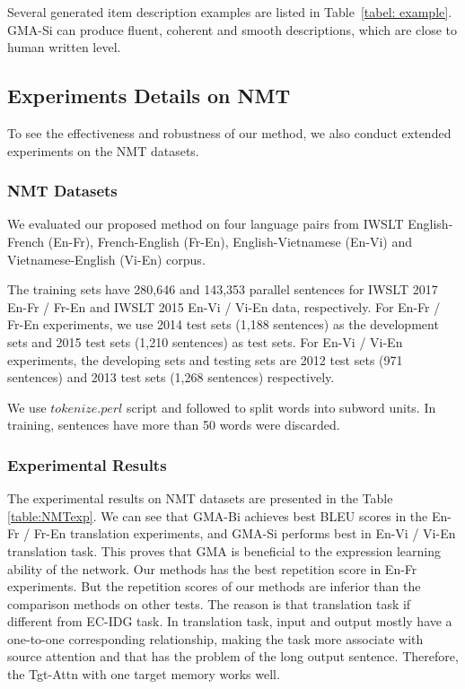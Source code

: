 \documentclass[letterpaper]{article} %
\begin{document}
Several generated item description examples are listed in Table~\ref{tabel: example}.
GMA-Si can produce fluent, coherent and smooth descriptions, which are close to human written level.

\subsection{Experiments Details on NMT}

To see the effectiveness and robustness of our method, we also conduct extended experiments on the NMT datasets.
\subsubsection{NMT Datasets}
We evaluated our proposed method on four language pairs from IWSLT  English-French (En-Fr), French-English (Fr-En), English-Vietnamese (En-Vi) and Vietnamese-English (Vi-En) corpus.

The training sets have 280,646 and 143,353 parallel sentences for IWSLT 2017 En-Fr / Fr-En and IWSLT 2015 En-Vi / Vi-En data, respectively.
For En-Fr / Fr-En experiments, we use 2014 test sets (1,188 sentences) as the development sets and 2015 test sets (1,210 sentences) as test sets. For En-Vi / Vi-En experiments, the developing sets and testing sets are 2012 test sets (971 sentences) and 2013 test sets (1,268 sentences) respectively.

We use $tokenize.perl$ script and followed \cite{cettoloEtAl:EAMT2012} to split words into subword units. In training, sentences have more than 50 words were discarded.
\subsubsection{Experimental Results}
The experimental results on NMT datasets are presented in the Table \ref{table:NMTexp}. 
We can see that GMA-Bi achieves best BLEU scores in the En-Fr / Fr-En translation experiments, and GMA-Si performs best in En-Vi / Vi-En translation task. 
This proves that GMA is beneficial to the expression learning ability of the network. 
Our methods has the best repetition score in En-Fr experiments. 
But the repetition scores of our methods are inferior than the comparison methods on other tests. 
The reason is that translation task if different from EC-IDG task. 
In translation task, input and output mostly have a one-to-one corresponding relationship, making the task more associate with source attention and that has the problem of the long output sentence. 
Therefore, the Tgt-Attn with one target memory works well.
\end{document}
